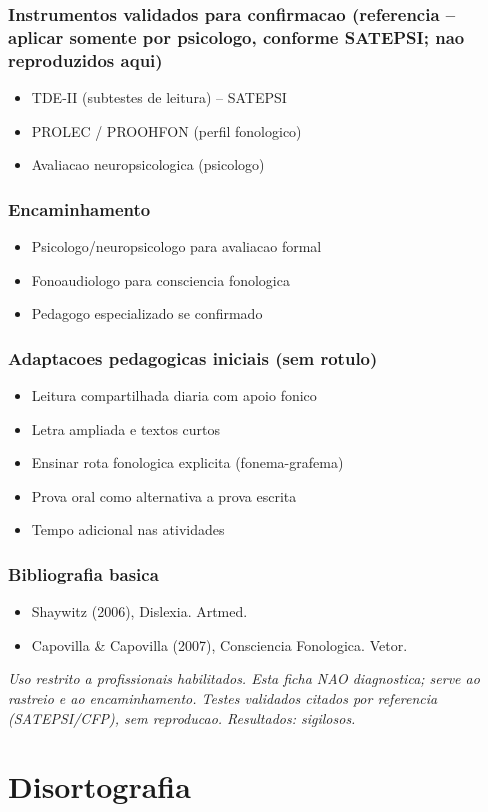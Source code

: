 \documentclass[a4paper,11pt]{book}
\newcommand{\avisolegal}{\par\medskip\noindent\footnotesize\itshape
\color{cinza}Uso restrito a profissionais habilitados. Esta ficha NAO diagnostica;
serve ao rastreio e ao encaminhamento. Testes validados citados por referencia
(SATEPSI/CFP), sem reproducao. Resultados: sigilosos.\color{black}\par}
\begin{document}
\subsection*{Instrumentos validados para confirmacao (referencia -- aplicar somente por psicologo, conforme SATEPSI; nao reproduzidos aqui)}
\begin{itemize}
\item TDE-II (subtestes de leitura) -- SATEPSI
\item PROLEC / PROOHFON (perfil fonologico)
\item Avaliacao neuropsicologica (psicologo)
\end{itemize}
\subsection*{Encaminhamento}
\begin{itemize}
\item Psicologo/neuropsicologo para avaliacao formal
\item Fonoaudiologo para consciencia fonologica
\item Pedagogo especializado se confirmado
\end{itemize}
\subsection*{Adaptacoes pedagogicas iniciais (sem rotulo)}
\begin{itemize}
\item Leitura compartilhada diaria com apoio fonico
\item Letra ampliada e textos curtos
\item Ensinar rota fonologica explicita (fonema-grafema)
\item Prova oral como alternativa a prova escrita
\item Tempo adicional nas atividades
\end{itemize}
\subsection*{Bibliografia basica}
\begin{itemize}
\item Shaywitz (2006), Dislexia. Artmed.
\item Capovilla \& Capovilla (2007), Consciencia Fonologica. Vetor.
\end{itemize}
\avisolegal


\chapter{Disortografia}
\end{document}
